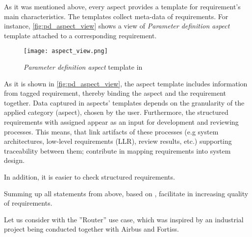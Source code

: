 As it was mentioned above, every aspect provides a template for requirement's main characteristics. The templates collect meta-data of requirements. For instance, \autoref{fig:pd_aspect_view} shows a view of \textit{Parameter definition aspect} template attached to a corresponding requirement. 
\begin{figure}[!t]
\centering
\texttt{[image: aspect\_view.png]}
\caption{\textit{Parameter definition aspect} template in \autof}
\label{fig:pd_aspect_view}
\end{figure}

As it is shown in \autoref{fig:pd_aspect_view}, the aspect template includes information from tagged requirement, thereby binding the aspect and the requirement together. Data captured in aspects' templates depends on the granularity of the applied category (aspect), chosen by the \cc user.  Furthermore, the structured requirements with assigned \asp appear as an input for development and reviewing processes. This means, that \asp link artifacts of these processes (e.g system architectures, low-level requirements (LLR), review results, etc.) supporting traceability between them; contribute in mapping requirements into system design. 

In addition, it is easier to check structured requirements.

Summing up all statements from above, \asp based on \cbc, facilitate in increasing quality of requirements. 

Let us consider \cc with the ”Router” use case, which was inspired by an industrial project being conducted together with Airbus and Fortiss. 

